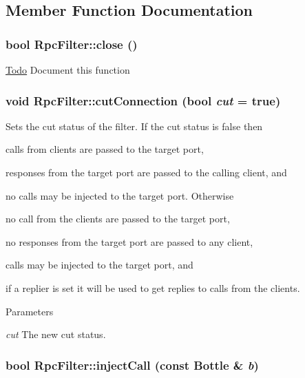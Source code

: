 \subsection{Member Function Documentation}
\hypertarget{classyarp_1_1os_1_1_rpc_filter_a7c3fd3737767ad8ae8730e44e96d1f20}{
\subsubsection[{close}]{\setlength{\rightskip}{0pt plus 5cm}bool RpcFilter::close ()}}
\label{classyarp_1_1os_1_1_rpc_filter_a7c3fd3737767ad8ae8730e44e96d1f20}
\begin{Desc}
\item[\hyperlink{todo__todo000009}{Todo}]Document this function \end{Desc}
\hypertarget{classyarp_1_1os_1_1_rpc_filter_ae7a72f77f502c0872a3efb87cffb17e4}{
\subsubsection[{cutConnection}]{\setlength{\rightskip}{0pt plus 5cm}void RpcFilter::cutConnection (bool {\em cut} = {\ttfamily true})}}
\label{classyarp_1_1os_1_1_rpc_filter_ae7a72f77f502c0872a3efb87cffb17e4}
Sets the cut status of the filter. If the cut status is {\ttfamily false} then
\begin{DoxyItemize}
\item calls from clients are passed to the target port,
\item responses from the target port are passed to the calling client, and
\item no calls may be injected to the target port. Otherwise
\item no call from the clients are passed to the target port,
\item no responses from the target port are passed to any client,
\item calls may be injected to the target port, and
\item if a replier is set it will be used to get replies to calls from the clients. 
\begin{DoxyParams}{Parameters}
\item[{\em cut}]The new cut status. \end{DoxyParams}

\end{DoxyItemize}\hypertarget{classyarp_1_1os_1_1_rpc_filter_a18789775d8040efabf1bc8df5d0f1c86}{
\subsubsection[{injectCall}]{\setlength{\rightskip}{0pt plus 5cm}bool RpcFilter::injectCall (const Bottle \& {\em b})}}
